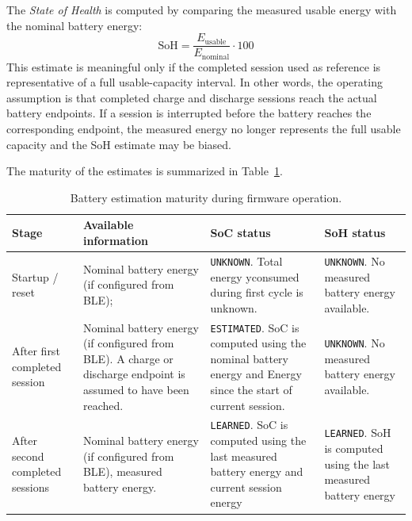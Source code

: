 The \textit{State of Health} is computed by comparing the measured usable energy
with the nominal battery energy:
\[
\mathrm{SoH} =
\frac{E_{\mathrm{usable}}}{E_{\mathrm{nominal}}} \cdot 100
\]
This estimate is meaningful only if the completed session used as reference is
representative of a full usable-capacity interval. In other words, the operating
assumption is that completed charge and discharge sessions reach the actual
battery endpoints. If a session is interrupted before the battery reaches the
corresponding endpoint, the measured energy no longer represents the full usable
capacity and the SoH estimate may be biased.

The maturity of the estimates is summarized in
Table~\ref{tab:battery_estimation_maturity}.



\begin{table}[H]
	\centering
	\small
	\setlength{\tabcolsep}{4pt}
	\renewcommand{\arraystretch}{1.5}
	\caption{Battery estimation maturity during firmware operation.}
	\label{tab:battery_estimation_maturity}
	\begin{tabularx}{\textwidth}{
			@{}
			>{\raggedright\arraybackslash}p{3.0cm}
			>{\raggedright\arraybackslash}X
			>{\raggedright\arraybackslash}p{3.5cm}
			>{\raggedright\arraybackslash}p{3.5cm}
			@{}
		}
		\toprule
		\textbf{Stage} &
		\textbf{Available information} &
		\textbf{SoC status} &
		\textbf{SoH status} \\
		\midrule
		
		Startup / reset &
		Nominal battery energy (if configured from BLE); &
		\texttt{UNKNOWN}. Total energy yconsumed during first cycle is unknown. &
		\texttt{UNKNOWN}. No measured battery energy available. \\
		
		After first completed session &
		Nominal battery energy (if configured from BLE). A charge or discharge endpoint is assumed to have been reached. &
		\texttt{ESTIMATED}. SoC is computed using the nominal battery energy and Energy since the start of current session. &
		\texttt{UNKNOWN}. No measured battery energy available. \\
		
		After second completed sessions &
		Nominal battery energy (if configured from BLE), measured battery energy.  &
		\texttt{LEARNED}. SoC is computed using the last measured battery energy and current session energy  &
		\texttt{LEARNED}. SoH is computed using the last measured battery energy \\
		
		\bottomrule
	\end{tabularx}
\end{table}


